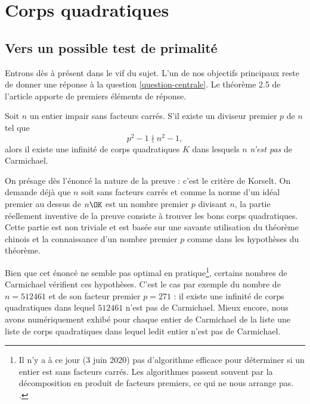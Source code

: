 \section{Corps quadratiques}

\subsection{Vers un possible test de primalité}

Entrons dès à présent dans le vif du sujet. L'un de nos objectifs principaux reste de donner une réponse à la question \ref{question-centrale}. Le théorème 2.5 de l'article apporte de premiers éléments de réponse.

\begin{theoreme}
	Soit $n$ un entier impair sans facteurs carrés. S'il existe un diviseur premier $p$ de $n$ tel que $$p^2 - 1 \nmid n^2 - 1,$$ alors il existe une infinité de corps quadratiques $K$ dans lesquels $n$ \emph{n'est pas} de Carmichael.
\end{theoreme}

\begin{remarque}
	On présage dès l'énoncé la nature de la preuve : c'est le critère de Korselt. On demande déjà que $n$ soit sans facteurs carrés et comme la norme d'un idéal premier au dessus de $n\OK$ est un nombre premier $p$ divisant $n$, la partie réellement inventive de la preuve consiste à trouver les bons corps quadratiques. Cette partie est non triviale et est basée sur une savante utilisation du théorème chinois et la connaissance d'un nombre premier $p$ comme dans les hypothèses du théorème.
\end{remarque}

Bien que cet énoncé ne semble pas optimal en pratique\footnote{Il n'y a à ce jour (3 juin 2020) pas d'algorithme efficace pour déterminer si un entier est sans facteurs carrés. Les algorithmes passent souvent par la décomposition en produit de facteurs premiers, ce qui ne nous arrange pas. .}, certains nombres de Carmichael vérifient ces hypothèses. C'est le cas par exemple du nombre de $n=512461$ et de son facteur premier $p=271$ : il existe une infinité de corps quadratiques dans lequel $512461$ n'est pas de Carmichael. Mieux encore, nous avons numériquement exhibé pour chaque entier de Carmichael de la liste  une liste de corps quadratiques dans lequel ledit entier n'est pas de Carmichael.  \\


